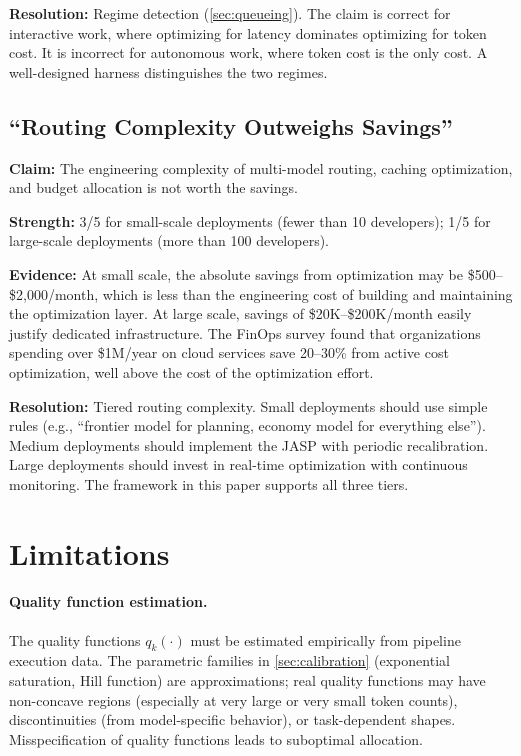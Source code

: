 \documentclass[11pt, a4paper, copyright]{googledeepmind}
\begin{document}
\textbf{Resolution:} Regime detection (\cref{sec:queueing}). The claim is correct for interactive work, where optimizing for latency dominates optimizing for token cost. It is incorrect for autonomous work, where token cost is the only cost. A well-designed harness distinguishes the two regimes.

\subsection{``Routing Complexity Outweighs Savings''}

\textbf{Claim:} The engineering complexity of multi-model routing, caching optimization, and budget allocation is not worth the savings.

\textbf{Strength:} 3/5 for small-scale deployments (fewer than 10 developers); 1/5 for large-scale deployments (more than 100 developers).

\textbf{Evidence:} At small scale, the absolute savings from optimization may be \$500--\$2,000/month, which is less than the engineering cost of building and maintaining the optimization layer. At large scale, savings of \$20K--\$200K/month easily justify dedicated infrastructure. The FinOps survey \citep{finops2023} found that organizations spending over \$1M/year on cloud services save 20--30\% from active cost optimization, well above the cost of the optimization effort.

\textbf{Resolution:} Tiered routing complexity. Small deployments should use simple rules (e.g., ``frontier model for planning, economy model for everything else''). Medium deployments should implement the JASP with periodic recalibration. Large deployments should invest in real-time optimization with continuous monitoring. The framework in this paper supports all three tiers.


\section{Limitations}\label{sec:limitations}

\paragraph{Quality function estimation.}
The quality functions $q_k(\cdot)$ must be estimated empirically from pipeline execution data. The parametric families in \cref{sec:calibration} (exponential saturation, Hill function) are approximations; real quality functions may have non-concave regions (especially at very large or very small token counts), discontinuities (from model-specific behavior), or task-dependent shapes. Misspecification of quality functions leads to suboptimal allocation.
\end{document}
